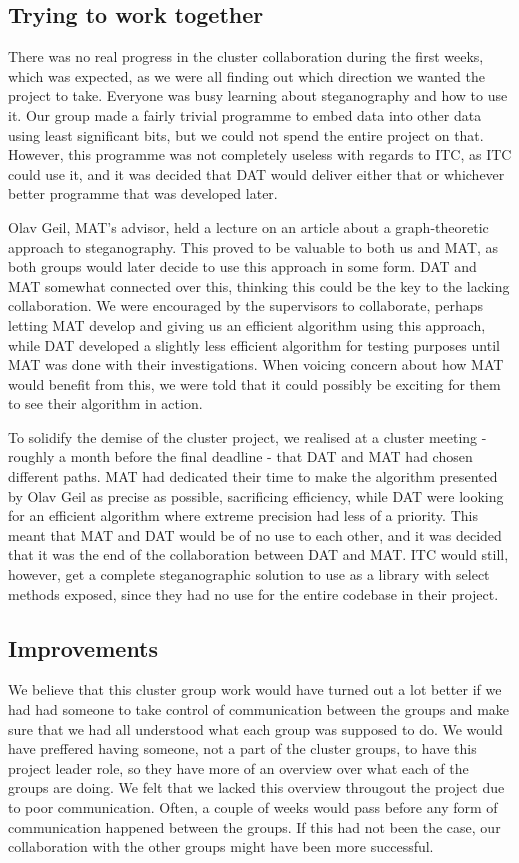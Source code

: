 \documentclass{article}
\begin{document}
\subsection*{Trying to work together}
There was no real progress in the cluster collaboration during the first weeks, which was expected, as we were all finding out which direction we wanted the project to take.
Everyone was busy learning about steganography and how to use it.
Our group made a fairly trivial programme to embed data into other data using least significant bits, but we could not spend the entire project on that.
However, this programme was not completely useless with regards to ITC, as ITC could use it, and it was decided that DAT would deliver either that or whichever better programme that was developed later.

Olav Geil, MAT's advisor, held a lecture on an article about a graph-theoretic approach to steganography.
This proved to be valuable to both us and MAT, as both groups would later decide to use this approach in some form.
DAT and MAT somewhat connected over this, thinking this could be the key to the lacking collaboration.
We were encouraged by the supervisors to collaborate, perhaps letting MAT develop and giving us an efficient algorithm using this approach, while DAT developed a slightly less efficient algorithm for testing purposes until MAT was done with their investigations.
When voicing concern about how MAT would benefit from this, we were told that it could possibly be exciting for them to see their algorithm in action.

To solidify the demise of the cluster project, we realised at a cluster meeting - roughly a month before the final deadline - that DAT and MAT had chosen different paths.
MAT had dedicated their time to make the algorithm presented by Olav Geil as precise as possible, sacrificing efficiency, while DAT were looking for an efficient algorithm where extreme precision had less of a priority.
This meant that MAT and DAT would be of no use to each other, and it was decided that it was the end of the collaboration between DAT and MAT.
ITC would still, however, get a complete steganographic solution to use as a library with select methods exposed, since they had no use for the entire codebase in their project.

\subsection*{Improvements}
We believe that this cluster group work would have turned out a lot better if we had had someone to take control of communication between the groups and make sure that we had all understood what each group was supposed to do. 
We would have preffered having someone, not a part of the cluster groups, to have this project leader role, so they have more of an overview over what each of the groups are doing.
We felt that we lacked this overview througout the project due to poor communication.
Often, a couple of weeks would pass before any form of communication happened between the groups. 
If this had not been the case, our collaboration with the other groups might have been more successful. 
\end{document}
